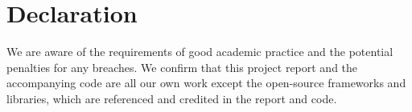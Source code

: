 \chapter*{Declaration}
We are aware of the requirements of good academic practice and the potential penalties for any breaches. We confirm that this project report and the accompanying code are all our own work except the open-source frameworks and libraries, which are referenced and credited in the report and code.